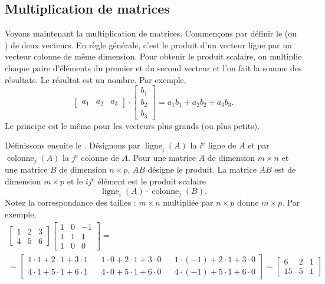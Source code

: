 \subsection{Multiplication de matrices}

Voyons maintenant la multiplication de matrices. Commençons par définir le
\emph{} (ou \emph{}) de deux vecteurs. En règle générale, c'est le produit d'un vecteur ligne par un vecteur colonne de même dimension. Pour obtenir le produit scalaire, on multiplie chaque paire d’éléments du premier et du second vecteur et l'on fait la somme des résultats. Le résultat est un nombre. Par exemple,
\begin{equation*}
\begin{bmatrix}
a_1 & a_2 & a_3
\end{bmatrix}
\cdot
\begin{bmatrix}
b_1 \\
b_2 \\
b_3
\end{bmatrix}
= a_1 b_1 + a_2 b_2 + a_3 b_3 .
\end{equation*}
Le principe est le même pour les vecteurs plus grands (ou plus petits).

Définissons ensuite le \emph{}. Désignons par $\operatorname{ligne}_i(A)$ la $i^{\text{e}}$ ligne
de $A$ et par
$\operatorname{colonne}_j(A)$ la $j^{\text{e}}$ colonne de $A$.
Pour une matrice $A$ de dimension $m \times n$ et une matrice $B$ de dimension $n \times p$,
$AB$ désigne le produit. La matrice $AB$ est de dimension $m \times p$
et le $ij^{\text{e}}$ élément est le produit scalaire
\begin{equation*}
\operatorname{ligne}_i(A) \cdot
\operatorname{colonne}_j(B) .
\end{equation*}
Notez la correspondance des tailles : $m \times n$ multipliée par $n \times p$ donne 
$m \times p$.  Par exemple,
\begin{multline*}
\begin{bmatrix}
1 & 2 & 3 \\
4 & 5 & 6
\end{bmatrix}
\begin{bmatrix}
1 & 0 & -1 \\
1 & 1 & 1 \\
1 & 0 & 0
\end{bmatrix}
= \\ =
\begin{bmatrix}
1\cdot 1 + 2\cdot 1 + 3 \cdot 1 &  &
1\cdot 0 + 2\cdot 1 + 3 \cdot 0 &  &
1\cdot (-1) + 2\cdot 1 + 3 \cdot 0 \\
4\cdot 1 + 5\cdot 1 + 6 \cdot 1 &  &
4\cdot 0 + 5\cdot 1 + 6 \cdot 0 &  &
4\cdot (-1) + 5\cdot 1 + 6 \cdot 0
\end{bmatrix}
=
\begin{bmatrix}
6 & 2 & 1 \\
15 & 5 & 1
\end{bmatrix}
\end{multline*}

